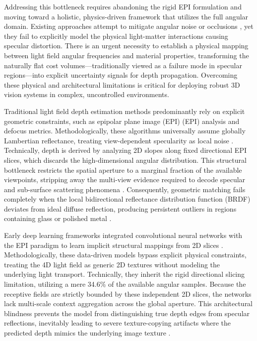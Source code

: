 \documentclass[lettersize,journal]{IEEEtran}
\begin{document}
Addressing this bottleneck requires abandoning the rigid EPI formulation and moving toward a holistic, physics-driven framework that utilizes the full angular domain. Existing approaches attempt to mitigate angular noise or occlusions \cite{wang2023}, yet they fail to explicitly model the physical light-matter interactions causing specular distortion. There is an urgent necessity to establish a physical mapping between light field angular frequencies and material properties, transforming the naturally flat cost volumes—traditionally viewed as a failure mode in specular regions—into explicit uncertainty signals for depth propagation. Overcoming these physical and architectural limitations is critical for deploying robust 3D vision systems in complex, uncontrolled environments.

Traditional light field depth estimation methods predominantly rely on explicit geometric constraints, such as epipolar plane image (EPI) (EPI) analysis and defocus metrics. Methodologically, these algorithms universally assume globally Lambertian reflectance, treating view-dependent specularity as local noise \cite{wanner2014}. Technically, depth is derived by analyzing 2D slopes along fixed directional EPI slices, which discards the high-dimensional angular distribution. This structural bottleneck restricts the spatial aperture to a marginal fraction of the available viewpoints, stripping away the multi-view evidence required to decode specular and sub-surface scattering phenomena \cite{tao2013}. Consequently, geometric matching fails completely when the local bidirectional reflectance distribution function (BRDF) deviates from ideal diffuse reflection, producing persistent outliers in regions containing glass or polished metal \cite{blinn1977}.

Early deep learning frameworks integrated convolutional neural networks with the EPI paradigm to learn implicit structural mappings from 2D slices \cite{heber2018}. Methodologically, these data-driven models bypass explicit physical constraints, treating the 4D light field as generic 2D textures without modeling the underlying light transport. Technically, they inherit the rigid directional slicing limitation, utilizing a mere 34.6\% of the available angular samples. Because the receptive fields are strictly bounded by these independent 2D slices, the networks lack multi-scale context aggregation across the global aperture. This architectural blindness prevents the model from distinguishing true depth edges from specular reflections, inevitably leading to severe texture-copying artifacts where the predicted depth mimics the underlying image texture \cite{lyu2022}.
\end{document}
